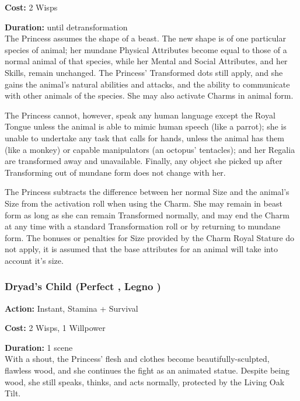 \noindent \textbf{Cost:} 2 Wisps

\noindent \textbf{Duration:} until detransformation \\

\noindent The Princess assumes the shape of a beast. The new shape is of one particular species of animal; her mundane Physical Attributes become equal to those of a normal animal of that species, while her Mental and Social Attributes, and her Skills, remain unchanged. The Princess' Transformed dots still apply, and she gains the animal's natural abilities and attacks, and the ability to communicate with other animals of the species. She may also activate Charms in animal form.

The Princess cannot, however, speak any human language except the Royal Tongue unless the animal is able to mimic human speech (like a parrot); she is unable to undertake any task that calls for hands, unless the animal has them (like a monkey) or capable manipulators (an octopus' tentacles); and her Regalia are transformed away and unavailable. Finally, any object she picked up after Transforming out of mundane form does not change with her.

The Princess subtracts the difference between her normal Size and the animal's Size from the activation roll when using the Charm. She may remain in beast form as long as she can remain Transformed normally, and may end the Charm at any time with a standard Transformation roll or by returning to mundane form. The bonuses or penalties for Size provided by the Charm Royal Stature do not apply, it is assumed that the base attributes for an animal will take into account it's size. 

\subsubsection*{Dryad's Child (Perfect \textbullet\textbullet\textbullet\textbullet\textbullet, Legno \textbullet\textbullet\textbullet\textbullet)}

\noindent \textbf{Action:} Instant, Stamina + Survival

\noindent \textbf{Cost:} 2 Wisps, 1 Willpower

\noindent \textbf{Duration:} 1 scene \\

\noindent  With a shout, the Princess' flesh and clothes become beautifully-sculpted, flawless wood, and she continues the fight as an animated statue. Despite being wood, she still speaks, thinks, and acts normally, protected by the Living Oak Tilt.

